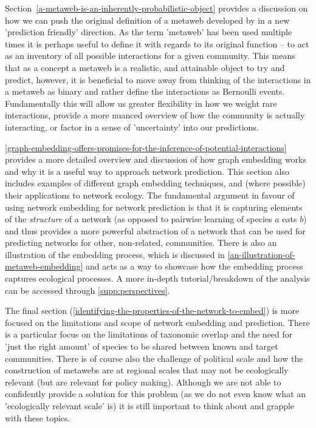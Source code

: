 \begin{refsection}
Section~\ref{a-metaweb-is-an-inherently-probabilistic-object} provides a discussion on how we can push the original definition of a metaweb developed by \cite{Dunne2006Network} in a new 'prediction friendly' direction. As the term 'metaweb' has been used multiple times it is perhaps useful to define it with regards to its original function -- to act as an inventory of all possible interactions for a given community. This means that as a concept a metaweb is a realistic, and attainable object to try and predict, however, it is beneficial to move away from thinking of the interactions in a metaweb as binary and rather define the interactions as Bernoulli events. Fundamentally this will allow us greater flexibility in how we weight rare interactions, provide a more nuanced overview of how the community is actually interacting, or factor in a sense of 'uncertainty' into our predictions.

\autoref{graph-embedding-offers-promises-for-the-inference-of-potential-interactions} provides a more detailed overview and discussion of how graph embedding works and why it is a useful way to approach network prediction. This section also includes examples of different graph embedding techniques, and (where possible) their applications to network ecology. The fundamental argument in favour of using network embedding for network prediction is that it is capturing elements of the \emph{structure} of a network (as opposed to pairwise learning of species $a$ eats $b$) and thus provides a more powerful abstraction of a network that can be used for predicting networks for other, non-related, communities. There is also an illustration of the embedding process, which is discussed in \autoref{an-illustration-of-metaweb-embedding} and acts as a way to showcase how the embedding process captures ecological processes. A more in-depth tutorial/breakdown of the analysis can be accessed through \autoref{supp:perspectives}.

The final section (\autoref{identifying-the-properties-of-the-network-to-embed}) is more focused on the limitations and scope of network embedding and prediction. There is a particular focus on the limitations of taxonomic overlap and the need for 'just the right amount' of species to be shared between known and target communities. There is of course also the challenge of political scale and how the construction of metawebs are at regional scales that may not be ecologically relevant (but are relevant for policy making). Although we are not able to confidently provide a solution for this problem (as we do not even know what an 'ecologically relevant scale' is) it is still important to think about and grapple with these topics.


\end{refsection}
